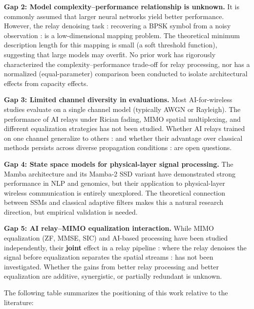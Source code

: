 \textbf{Gap 2: Model complexity--performance relationship is unknown.} It is commonly assumed that larger neural networks yield better performance. However, the relay denoising task : recovering a BPSK symbol from a noisy observation : is a low-dimensional mapping problem. The theoretical minimum description length for this mapping is small (a soft threshold function), suggesting that large models may overfit. No prior work has rigorously characterized the complexity--performance trade-off for relay processing, nor has a normalized (equal-parameter) comparison been conducted to isolate architectural effects from capacity effects.

\textbf{Gap 3: Limited channel diversity in evaluations.} Most AI-for-wireless studies evaluate on a single channel model (typically AWGN or Rayleigh). The performance of AI relays under Rician fading, MIMO spatial multiplexing, and different equalization strategies has not been studied. Whether AI relays trained on one channel generalize to others : and whether their advantage over classical methods persists across diverse propagation conditions : are open questions.

\textbf{Gap 4: State space models for physical-layer signal processing.} The Mamba architecture \cite{GuDao2024Mamba} and its Mamba-2 SSD variant \cite{DaoGu2024TransformersSSM} have demonstrated strong performance in NLP and genomics, but their application to physical-layer wireless communication is entirely unexplored. The theoretical connection between SSMs and classical adaptive filters makes this a natural research direction, but empirical validation is needed.

\textbf{Gap 5: AI relay--MIMO equalization interaction.} While MIMO equalization (ZF, MMSE, SIC) and AI-based processing have been studied independently, their \textbf{joint} effect in a relay pipeline : where the relay denoises the signal before equalization separates the spatial streams : has not been investigated. Whether the gains from better relay processing and better equalization are additive, synergistic, or partially redundant is unknown.

The following table summarizes the positioning of this work relative to the literature:

